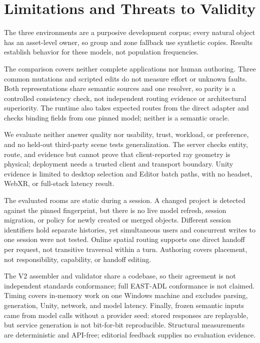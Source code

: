 \section{Limitations and Threats to Validity}

The three environments are a purposive development corpus; every natural object
has an asset-level owner, so group and zone fallback use synthetic copies.
Results establish behavior for these models, not population frequencies.

The comparison covers neither complete applications nor human authoring. Three
common mutations and scripted edits do not measure effort or unknown faults.
Both representations share semantic sources and one resolver, so parity is a
controlled consistency check, not independent routing evidence or architectural
superiority. The runtime also takes expected routes from the direct adapter and
checks binding fields from one pinned model; neither is a semantic oracle.

We evaluate neither answer quality nor usability, trust, workload, or
preference, and no held-out third-party scene tests generalization. The server
checks entity, route, and evidence but cannot prove that client-reported ray
geometry is physical; deployment needs a trusted client and transport boundary.
Unity evidence is limited to desktop selection and Editor batch paths, with no
headset, WebXR, or full-stack latency result.

The evaluated rooms are static during a session. A changed project is detected
against the pinned fingerprint, but there is no live model refresh, session
migration, or policy for newly created or merged objects. Different session
identifiers hold separate histories, yet simultaneous users and concurrent
writes to one session were not tested. Online spatial routing supports one
direct handoff per request, not transitive traversal within a turn. Authoring
covers placement, not responsibility, capability, or handoff editing.

The V2 assembler and validator share a codebase, so their agreement is not
independent standards conformance; full EAST-ADL conformance is not claimed.
Timing covers in-memory work on one Windows machine and excludes parsing,
generation, Unity, network, and model latency. Finally, frozen semantic inputs
came from model calls without a provider seed: stored responses are replayable,
but service generation is not bit-for-bit reproducible. Structural measurements
are deterministic and API-free; editorial feedback supplies no evaluation
evidence.
